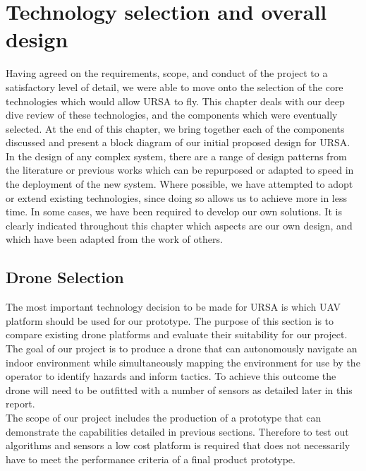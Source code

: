 \documentclass[capstone_report.tex]{subfiles}
\begin{document}
\chapter{Technology selection and overall design}
Having agreed on the requirements, scope, and conduct of the project to a satisfactory level of detail, we were able to move onto the selection of the core technologies which would allow URSA to fly. This chapter deals with our deep dive review of these technologies, and the components which were eventually selected. At the end of this chapter, we bring together each of the components discussed and present a block diagram of our initial proposed design for URSA.\\

In the design of any complex system, there are a range of design patterns from the literature or previous works which can be repurposed or adapted to speed in the deployment of the new system. Where possible, we have attempted to adopt or extend existing technologies, since doing so allows us to achieve more in less time. In some cases, we have been required to develop our own solutions. It is clearly indicated throughout this chapter which aspects are our own design, and which have been adapted from the work of others.

\pagebreak

\section{Drone Selection}
The most important technology decision to be made for URSA is which UAV platform should be used for our prototype. The purpose of this section is to compare existing drone platforms and evaluate their suitability for our project.\\

The goal of our project is to produce a drone that can autonomously navigate an indoor environment while simultaneously mapping the environment for use by the operator to identify hazards and inform tactics.  To achieve this outcome the drone will need to be outfitted with a number of sensors as detailed later in this report.\\

The scope of our project includes the production of a prototype that can demonstrate the capabilities detailed in previous sections.  Therefore to test out algorithms and sensors a low cost platform is required that does not necessarily have to meet the performance criteria of a final product prototype.\\
\end{document}
